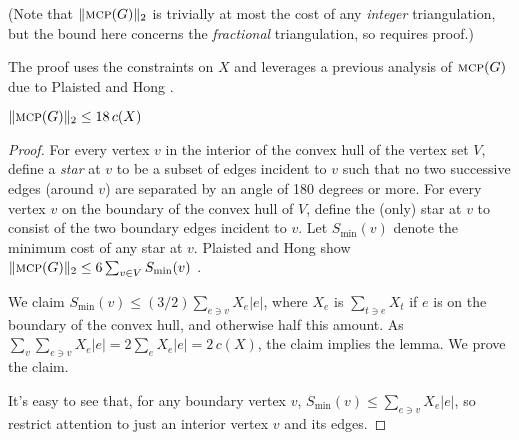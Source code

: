 \documentclass[final]{siamltex}
\newcommand{\MCP}{\text{\sc mcp}}
\newcommand{\cost}{c}
\newcommand{\edge}{e}
\newcommand{\graph}{G}
\newcommand{\tri}{t}  \newcommand{\vertex}{v}
\newcommand{\vertices}{V}
\newcommand{\fracTriang}{X}
\begin{document}
(Note that $\|\MCP(\graph)\|_2$ is trivially at most the cost of any {\em integer}
triangulation, but the bound here concerns the {\em fractional} triangulation,
so requires proof.)

The proof uses the constraints on $\fracTriang$ and leverages
a previous analysis of $\MCP(\graph)$
due to Plaisted and Hong \cite[Lemma 10]{plaisted1987heuristic}.
\begin{lemma}\label{lemma:fracmcp}
 $\|\MCP(\graph)\|_2\le 18\, \cost(\fracTriang)$
\end{lemma}

\begin{proof}
  For every vertex $\vertex$ in the interior of the convex hull of the vertex set $\vertices$, 
  define a {\em star} at $\vertex$ to be a subset of edges incident to $\vertex$
  such that no two successive edges (around $\vertex$) 
  are separated by an angle of 180 degrees or more.
  For every vertex $\vertex$ on the boundary of the convex hull of $\vertices$, 
  define the (only) star at $\vertex$ to consist
  of the two boundary edges  incident to $\vertex$.
Let $S_{\min}(\vertex)$ denote the minimum cost of any star at $\vertex$.
  Plaisted and Hong show $\|\MCP(\graph)\|_2 \le 6 \sum_{\vertex\in\vertices} S_{\min}(\vertex)$
  \cite[Lemma 10]{plaisted1987heuristic}.

  We claim $S_{\min}(\vertex) \le (3/2) \sum_{\edge \ni \vertex} \fracTriang_\edge|\edge|$, where $\fracTriang_\edge$ is $\sum_{\tri\ni\edge}\fracTriang_\tri$ if $\edge$ is on the boundary of the convex hull, 
  and otherwise half this amount.
  As $\sum_\vertex \sum_{\edge\ni \vertex} \fracTriang_\edge|\edge| = 2\sum_\edge \fracTriang_\edge|\edge| = 2\,\cost(\fracTriang)$,
  the claim implies the lemma.
  We prove the claim.

  It's easy to see that, for any boundary vertex $\vertex$, $S_{\min}(\vertex) \le \sum_{\edge \ni \vertex} \fracTriang_\edge|\edge|$, 
  so restrict attention to just an interior vertex $\vertex$ and its edges.

  \newcommand{\wrap}{\text{wrap}}


\end{proof}
\end{document}
